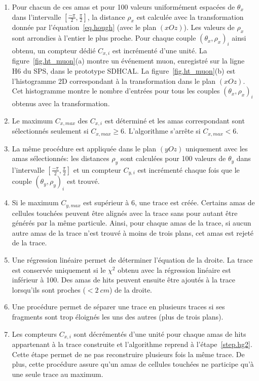 \begin {enumerate}[~~1-]
\item Pour chacun de ces amas et pour 100 valeurs uniformément espacées de $\theta_x$ dans l'intervalle $[\frac{-\pi}{2},\frac{\pi}{2}]$, la distance $\rho_x$ est calculée avec la transformation donnée par l'équation~\ref{eq.hough} (avec le plan $(xOz)$). Les valeurs de $\rho_x$ sont arrondies à l'entier le plus proche. Pour chaque couple ${(\theta_x,\rho_x)}_i$ ainsi obtenu, un compteur dédié $C_{x,i}$ est incrémenté d'une unité. La figure~\ref{fig.ht_muon}(a) montre un événement muon, enregistré sur la ligne H6 du SPS, dans le prototype SDHCAL. La figure~\ref{fig.ht_muon}(b) est l’histogramme 2D correspondant à la transformation dans le plan $(xOz)$. Cet histogramme montre le nombre d'entrées pour tous les couples ${(\theta_x ,\rho_x)}_i$ obtenus avec la transformation. 
\item \label{step.hg2} Le maximum $C_{x,max}$ des $C_{x,i}$ est déterminé et les amas correspondant sont sélectionnés seulement si $C_{x,max}\geq 6$. L'algorithme s'arrête si $C_{x,max}<6$.
\item La même procédure est appliquée dans le plan $(yOz)$ uniquement avec les amas sélectionnés: les distances $\rho_y$ sont calculées pour 100 valeurs de $\theta_y$ dans l'intervalle $[\frac{-\pi}{2},\frac{\pi}{2}]$ et un compteur $C_{y,i}$ est incrémenté chaque fois que le couple ${(\theta_y,\rho_y)}_i$ est trouvé. 
\item Si le maximum $C_{y,max}$ est supérieur à 6, une trace est créée. Certains amas de cellules touchées peuvent être alignés avec la trace sans pour autant être générés par la même particule. Ainsi, pour chaque amas de la trace, si aucun autre amas de la trace n'est trouvé à moins de trois plans, cet amas est rejeté de la trace. 
\item Une régression linéaire permet de déterminer l'équation de la droite. La trace est conservée uniquement si le $\chi^2$ obtenu avec la régression linéaire est inférieur à 100. Des amas de hits peuvent ensuite être ajoutés à la trace lorsqu'ils sont proches ($<2~cm$) de la droite. 
\item Une procédure permet de séparer une trace en plusieurs traces si ses fragments sont trop éloignés les uns des autres (plus de trois plans).%
\item Les compteurs $C_{x,i}$ sont décrémentés d'une unité pour chaque amas de hits appartenant à la trace construite et l'algorithme reprend à l'étape~\ref{step.hg2}. Cette étape permet de ne pas reconstruire plusieurs fois la même trace. De plus, cette procédure assure qu'un amas de cellules touchées ne participe qu'à une seule trace au maximum.
\end{enumerate}
